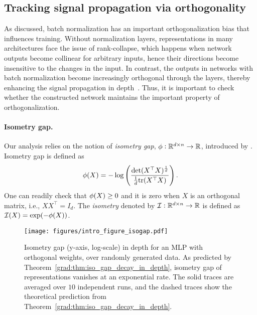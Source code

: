 \subsection{Tracking signal propagation via orthogonality}
\label{grad:sec:orthogonality}
As discussed, batch normalization has an important orthogonalization bias that influences training. Without normalization layers, representations in many architectures face the issue of rank-collapse, which happens when network outputs become collinear for arbitrary inputs, hence their directions become insensitive to the changes in the input. In contrast, the outputs in networks with batch normalization become increasingly orthogonal through the layers, thereby enhancing the signal propagation in depth~\cite{daneshmand2021batch}. Thus, it is important to check whether the constructed network maintains the important property of orthogonalization. 

\paragraph{Isometry gap.}
Our analysis relies on the notion of \emph{isometry gap}, $\phi: \mathbb{R}^{d\times n} \to \mathbb{R}$, introduced by \citet{joudaki2023impact}. Isometry gap is defined as
\begin{align}\label{grad:eq:iso_gap}
 \phi(X) = -\log \left(\frac{\text{det}(X^\top X)^{\frac{1}{d}} }{\frac{1}{d}\mathrm{tr}(X^\top X)} \right). 
\end{align}
One can readily check that $\phi(X) \geq 0$ and it is zero when $X$ is an orthogonal matrix, i.e., $X X^\top = I_d$. The \emph{isometry} denoted by $\mathcal{I}:\mathbb{R}^{d\times n} \to \mathbb{R}$ is defined as $\mathcal{I}(X) = \exp(-\phi(X))$. 

\begin{figure}[ht]
    \centering
    \texttt{[image: figures/intro\_figure\_isogap.pdf]}
    \caption{Isometry gap (y-axis, log-scale) in depth for an MLP with orthogonal weights, over randomly generated data. As predicted by Theorem~\ref{grad:thm:iso_gap_decay_in_depth}, isometry gap of representations vanishes at an exponential rate. The solid traces are averaged over $10$ independent runs, and the dashed traces show the theoretical prediction from Theorem~\ref{grad:thm:iso_gap_decay_in_depth}.}
    \label{grad:fig:linear_contrast} 
\end{figure}

